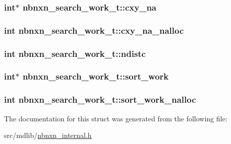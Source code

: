 \hypertarget{structnbnxn__search__work__t_ae025662821071a059e83633100e5ef8a}{
\subsubsection[{cxy\-\_\-na}]{\setlength{\rightskip}{0pt plus 5cm}int$\ast$ {\bf nbnxn\-\_\-search\-\_\-work\-\_\-t\-::cxy\-\_\-na}}}\label{structnbnxn__search__work__t_ae025662821071a059e83633100e5ef8a}
\hypertarget{structnbnxn__search__work__t_aaf72fa39ee40f2a936637a6b90769fbd}{
\subsubsection[{cxy\-\_\-na\-\_\-nalloc}]{\setlength{\rightskip}{0pt plus 5cm}int {\bf nbnxn\-\_\-search\-\_\-work\-\_\-t\-::cxy\-\_\-na\-\_\-nalloc}}}\label{structnbnxn__search__work__t_aaf72fa39ee40f2a936637a6b90769fbd}
\hypertarget{structnbnxn__search__work__t_a3c089ca182a3bba8aa4f741db3f6761f}{
\subsubsection[{ndistc}]{\setlength{\rightskip}{0pt plus 5cm}int {\bf nbnxn\-\_\-search\-\_\-work\-\_\-t\-::ndistc}}}\label{structnbnxn__search__work__t_a3c089ca182a3bba8aa4f741db3f6761f}
\hypertarget{structnbnxn__search__work__t_aff6170bb2c18646132607f267a84d058}{
\subsubsection[{sort\-\_\-work}]{\setlength{\rightskip}{0pt plus 5cm}int$\ast$ {\bf nbnxn\-\_\-search\-\_\-work\-\_\-t\-::sort\-\_\-work}}}\label{structnbnxn__search__work__t_aff6170bb2c18646132607f267a84d058}
\hypertarget{structnbnxn__search__work__t_a3fc4c46a5b20300a7b844b46aa7ddb81}{
\subsubsection[{sort\-\_\-work\-\_\-nalloc}]{\setlength{\rightskip}{0pt plus 5cm}int {\bf nbnxn\-\_\-search\-\_\-work\-\_\-t\-::sort\-\_\-work\-\_\-nalloc}}}\label{structnbnxn__search__work__t_a3fc4c46a5b20300a7b844b46aa7ddb81}


\-The documentation for this struct was generated from the following file\-:\begin{DoxyCompactItemize}
\item 
src/mdlib/\hyperlink{nbnxn__internal_8h}{nbnxn\-\_\-internal.\-h}\end{DoxyCompactItemize}
